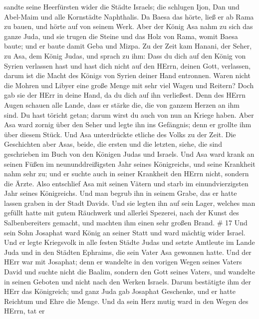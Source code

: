 sandte seine Heerfürsten wider die Städte Israels; die schlugen Ijon,
Dan und Abel-Maim und alle Kornstädte Naphthalis.  Da Baesa
das hörte, ließ er ab Rama zu bauen, und hörte auf von seinem Werk.
 Aber der König Asa nahm zu sich das ganze Juda, und sie
trugen die Steine und das Holz von Rama, womit Baesa baute; und er baute
damit Geba und Mizpa.  Zu der Zeit kam Hanani, der Seher, zu
Asa, dem König Judas, und sprach zu ihm: Dass du dich auf den König von
Syrien verlassen hast und hast dich nicht auf den HErrn, deinen Gott,
verlassen, darum ist die Macht des Königs von Syrien deiner Hand
entronnen.  Waren nicht die Mohren und Libyer eine große
Menge mit sehr viel Wagen und Reitern? Doch gab sie der HErr in deine
Hand, da du dich auf ihn verließest.  Denn des HErrn Augen
schauen alle Lande, dass er stärke die, die von ganzem Herzen an ihm
sind. Du hast töricht getan; darum wirst du auch von nun an Kriege
haben.  Aber Asa ward zornig über den Seher und legte ihn
ins Gefängnis; denn er grollte ihm über diesem Stück. Und Asa
unterdrückte etliche des Volks zu der Zeit.  Die
Geschichten aber Asas, beide, die ersten und die letzten, siehe, die
sind geschrieben im Buch von den Königen Judas und Israels.
 Und Asa ward krank an seinen Füßen im neununddreißigsten
Jahr seines Königreichs, und seine Krankheit nahm sehr zu; und er suchte
auch in seiner Krankheit den HErrn nicht, sondern die Ärzte.
 Also entschlief Asa mit seinen Vätern und starb im
einundvierzigsten Jahr seines Königreichs.  Und man begrub
ihn in seinem Grabe, das er hatte lassen graben in der Stadt Davids. Und
sie legten ihn auf sein Lager, welches man gefüllt hatte mit gutem
Räuchwerk und allerlei Spezerei, nach der Kunst des Salbenbereiters
gemacht, und machten ihm einen sehr großen Brand. \# 17  Und
sein Sohn Josaphat ward König an seiner Statt und ward mächtig wider
Israel.  Und er legte Kriegsvolk in alle festen Städte Judas
und setzte Amtleute im Lande Juda und in den Städten Ephraims, die sein
Vater Asa gewonnen hatte.  Und der HErr war mit Josaphat;
denn er wandelte in den vorigen Wegen seines Vaters David und suchte
nicht die Baalim,  sondern den Gott seines Vaters, und
wandelte in seinen Geboten und nicht nach den Werken Israels.
 Darum bestätigte ihm der HErr das Königreich; und ganz Juda
gab Josaphat Geschenke, und er hatte Reichtum und Ehre die Menge.
 Und da sein Herz mutig ward in den Wegen des HErrn, tat er
